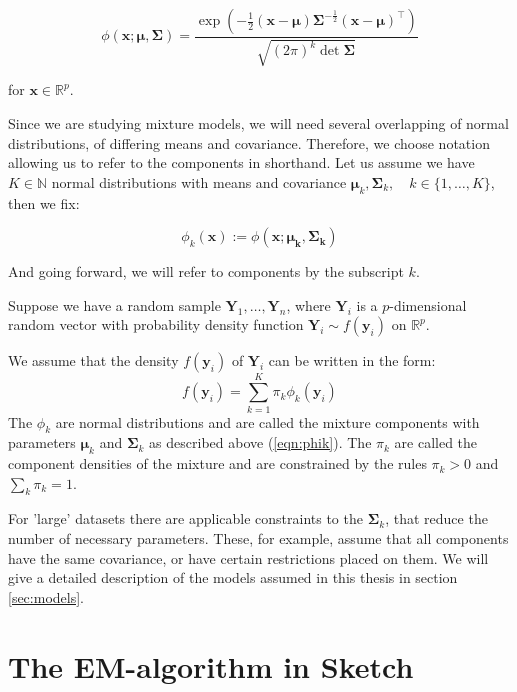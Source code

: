 \begin{equation} 
    \phi(\pmb{x;\mu,\Sigma})=
    \frac{\exp(-\frac{1}{2}(\pmb{x-\mu})\pmb{\Sigma}^{-\frac{1}{2}}(\pmb{x-\mu})^\top)}
         {\sqrt{(2\pi)^k \det{\pmb{\Sigma}}}}  
\end{equation}

for $\pmb{x} \in \mathbb{R}^p$.

Since we are studying mixture models, we will need several overlapping of 
normal distributions, of differing means and covariance. Therefore, we choose
notation allowing us to refer to the components in shorthand. Let us assume we
have $K \in \mathbb{N}$ normal distributions with means and covariance 
$\pmb{\mu}_k, \pmb{\Sigma}_k,\quad k \in \{1, \dots , K\}$, then we fix:

\begin{equation} 
    \phi_k(\pmb{x}) := \phi(\pmb{x;\mu_k, \Sigma_k})
    \label{eqn:phik}
\end{equation}

And going forward, we will refer to components by the subscript $k$.

\begin{definition}
    Suppose we have a random sample $ \pmb{Y}_1, \dots , \pmb{Y}_n $, where
    $\pmb{Y}_i$ is a $p$-dimensional random vector with probability density 
    function $ \pmb{Y}_i \sim f(\pmb{y}_i) $ on $\mathbb{R}^p$.

    We assume that the density $ f(\pmb{y}_i) $ of $ \pmb{Y}_i $ can 
    be written in the form: 
    \begin{equation} 
        f(\pmb{y}_i) = \sum_{k=1}^{K} \pi_k \phi_k (\pmb{y}_i)
        \label{eqn:mixture}
    \end{equation}
    The $\phi_k$ are normal distributions and are called the mixture components
    with parameters $\pmb{\mu}_k$ and $\pmb{\Sigma}_k$ as described above 
    (\ref{eqn:phik}).
    The $ \pi_k $ are called the component densities of the mixture and are
    constrained by the rules $\pi_k > 0$ and $\sum_k \pi_k = 1$.
\end{definition}

For 'large' datasets there are applicable constraints to the $\pmb{\Sigma}_k$, 
that reduce the number of necessary parameters. These, for example, assume that 
all components have the same covariance, or have certain restrictions placed on 
them. We will give a detailed description of the models assumed in this thesis 
in section \ref{sec:models}.


\section{The EM-algorithm in Sketch}
\label{sec:sketch}

